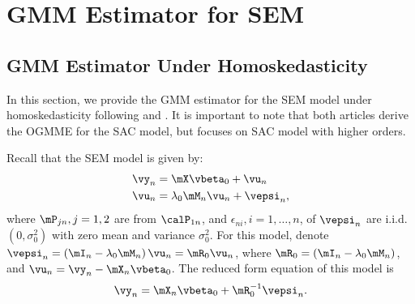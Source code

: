 \section{GMM Estimator for SEM}\label{sec:gmm-sem}

\subsection{GMM Estimator Under Homoskedasticity}

In this section, we provide the GMM estimator for the SEM model under homoskedasticity following \cite{lee2010efficient} and \cite{liu2010efficient}. It is important to note that both articles derive the OGMME for the SAC model, but \cite{lee2010efficient} focuses on SAC model with higher orders. 

Recall that the SEM model is given by:
\begin{equation*}
 \begin{aligned}
  \vy_n  & = \mX\vbeta_0 +  \vu_n  \\
  \vu_n & =\lambda_0 \mM_n\vu_n + \vepsi_n, 
\end{aligned}
\end{equation*}
%
where $\mP_{jn}, j = 1,2$ are from $\calP_{1n}$, and $\epsilon_{ni}, i = 1, \ldots, n$, of $\vepsi_n$  are i.i.d. $(0, \sigma^2_0)$ with zero mean and variance $\sigma_0^2$. For this model, denote $\vepsi_n = \left(\mI_n - \lambda_0\mM_n\right)\vu_n = \mR_0\vu_n$, where $\mR_0 = \left(\mI_n - \lambda_0\mM_n\right)$, and $\vu_n = \vy_n - \mX_n\vbeta_0$. The reduced form equation of this model is
\begin{equation}\label{eq:reduced-sem-gmm}
\vy_n = \mX_n\vbeta_0 + \mR_0^{-1}\vepsi_n. 
\end{equation}

